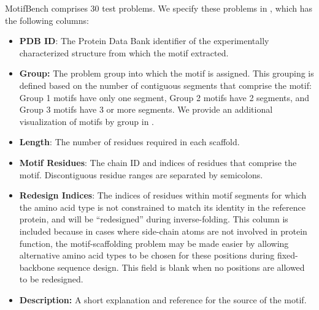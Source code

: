 
MotifBench comprises 30 test problems.
We specify these problems in , which has the following columns:
\begin{itemize}
\item{\textbf{PDB ID}: The Protein Data Bank identifier of the experimentally characterized structure from which the motif extracted.}
\item{\textbf{Group:} The problem group into which the motif is assigned. This grouping is defined based on the number of contiguous segments that comprise the motif: Group 1 motifs have only one segment, Group 2 motifs have 2 segments, and Group 3 motifs have 3 or more segments. We provide an additional visualization of motifs by group in . }
\item{\textbf{Length}: The number of residues required in each scaffold.}
\item{\textbf{Motif Residues}: The chain ID and indices of residues that comprise the motif. Discontiguous residue ranges are separated by semicolons.}
\item{\textbf{Redesign Indices}: The indices of residues within motif segments for which the amino acid type is not constrained to match its identity in the reference protein, and will be ``redesigned'' during inverse-folding. This column is included because in cases where side-chain atoms are not involved in protein function, the motif-scaffolding problem may be made easier by allowing alternative amino acid types to be chosen for these positions during fixed-backbone sequence design.  This field is blank when no positions are allowed to be redesigned.}
\item{\textbf{Description:} A short explanation and reference for the source of the motif.}
\end{itemize}


